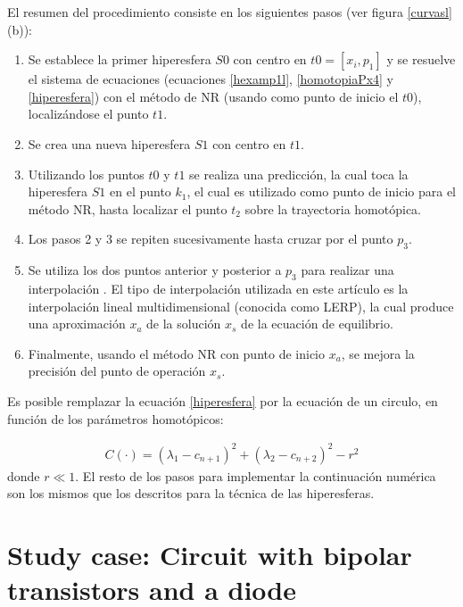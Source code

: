 \documentclass[conference,letterpaper,twocolumn]{IEEEtran}
\begin{document}
El resumen del procedimiento consiste en los siguientes pasos \cite{hiper} (ver figura \ref{curvasl}(b)):

\begin{enumerate}
\item Se  establece la primer hiperesfera $S0$ con centro en $t0=[x_i,p_1]$ y se resuelve el sistema de ecuaciones (ecuaciones \ref{hexamp1l}, \ref{homotopiaPx4} y \ref{hiperesfera})
con el método de NR (usando como punto de inicio el $t0$), localizándose el punto $t1$.
\item Se crea una nueva hiperesfera $S1$ con centro en $t1$.
\item Utilizando los puntos $t0$ y $t1$ se realiza una predicción, la cual toca la hiperesfera $S1$ en el punto $k_1$,
el cual es utilizado como punto de inicio para el método NR, hasta localizar el punto $t_2$ sobre la trayectoria homotópica. 
\item Los pasos 2 y 3 se repiten sucesivamente hasta cruzar por el punto $p_3$.
\item Se utiliza los dos puntos anterior y posterior a $p_3$ para realizar una interpolación \cite{homo_sosonkina}. El tipo de
interpolación utilizada en este artículo es la interpolación lineal multidimensional (conocida como LERP),
la cual produce una aproximación $x_{a}$  de la solución $x_s$ de la ecuación  de equilibrio.
\item Finalmente, usando el método NR con punto de inicio $x_a$, se mejora la precisión del punto de operación $x_s$.
\end{enumerate}

Es posible remplazar la ecuación \ref{hiperesfera} por la ecuación de un circulo, en función de los parámetros homotópicos:

{\small
\begin{equation}
\begin{array}{c}
C(\cdot)=(\lambda_1-c_{n+1})^2+(\lambda_2-c_{n+2})^2-r^2
\end{array}
\label{hiperesfera1}
\end{equation}}
donde $r\ll 1$. El resto de los pasos para implementar la continuación numérica son los mismos que los descritos para la técnica
de las hiperesferas.



\section{Study case: Circuit with bipolar transistors and a diode}
\end{document}

